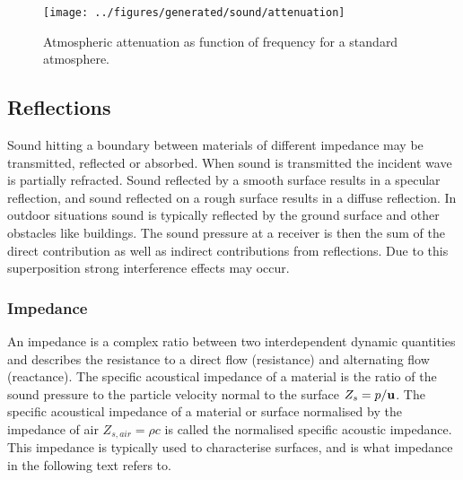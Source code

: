 \begin{figure}[H]
        \centering
        \texttt{[image: ../figures/generated/sound/attenuation]}
        \caption{Atmospheric attenuation as function of frequency for a standard atmosphere.}
        \label{fig:theory:sound:attenuation}
\end{figure}

\newpage
\subsection{Reflections}
Sound hitting a boundary between materials of different impedance may be
transmitted, reflected or absorbed. When sound is transmitted the incident wave
is partially refracted. Sound reflected by a smooth surface results in a
specular reflection, and sound reflected on a rough surface results in a diffuse
reflection. In outdoor situations sound is typically reflected by the ground
surface and other obstacles like buildings. The sound pressure at a receiver is
then the sum of the direct contribution as well as indirect contributions from
reflections. Due to this superposition strong interference effects may occur.

\subsubsection*{Impedance}
An impedance is a complex ratio between two interdependent dynamic quantities
and describes the resistance to a direct flow (resistance) and alternating flow
(reactance). The specific acoustical impedance of a material is the ratio of the
sound pressure to the particle velocity normal to the surface $Z_{s} =
p/\mathbf{u}$. The specific acoustical impedance of a material or surface
normalised by the impedance of air $Z_{s, air} = \rho c$ is called the
normalised specific acoustic impedance. This impedance is typically used to
characterise surfaces, and is what impedance in the following text refers to.


